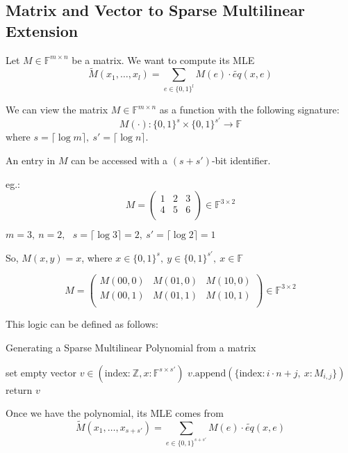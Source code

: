 \documentclass{article}
\theoremstyle{definition}
\begin{document}
\subsection{Matrix and Vector to Sparse Multilinear Extension}

Let $M \in \mathbb{F}^{m \times n}$ be a matrix. We want to compute its MLE
$$\widetilde{M}(x_1, \ldots, x_l) = \sum_{e \in \{0, 1 \}^l} M(e) \cdot \widetilde{eq}(x, e)$$

We can view the matrix $M \in \mathbb{F}^{m \times n}$ as a function with the following signature:
$$M(\cdot): \{0,1\}^s \times \{0,1\}^{s'} \rightarrow \mathbb{F}$$
where $s = \lceil \log m \rceil,~ s' = \lceil \log n \rceil$.

An entry in $M$ can be accessed with a $(s+s')$-bit identifier.

eg.:
$$
M = \begin{pmatrix}
1 & 2 & 3\\
4 & 5 & 6\\
\end{pmatrix}
\in \mathbb{F}^{3 \times 2}
$$

$m = 3,~ n = 2,~~~ s = \lceil \log 3 \rceil = 2,~ s' = \lceil \log 2 \rceil = 1$

So, $M(x, y) = x$, where $x \in \{0,1\}^s,~ y \in \{0,1\}^{s'},~ x \in \mathbb{F}$

$$
M = \begin{pmatrix}
M(00,0) & M(01,0) & M(10,0)\\
M(00,1) & M(01,1) & M(10,1)\\
\end{pmatrix}
\in \mathbb{F}^{3 \times 2}
$$

This logic can be defined as follows:

\begin{algorithm}[H]
\caption{Generating a Sparse Multilinear Polynomial from a matrix}
\begin{algorithmic}
	\State set empty vector $v \in (\text{index:}~ \mathbb{Z}, x: \mathbb{F}^{s \times s'})$
			\State $v.\text{append}( \{ \text{index}: i \cdot n + j,~ x: M_{i,j} \} )$
		\EndIf
	\EndFor
	\EndFor
	\State return $v$    
\end{algorithmic}
\end{algorithm}

Once we have the polynomial, its MLE comes from
$$\widetilde{M}(x_1, \ldots, x_{s+s'}) = \sum_{e \in \{0,1\}^{s+s'}} M(e) \cdot \widetilde{eq}(x, e)$$
\end{document}
